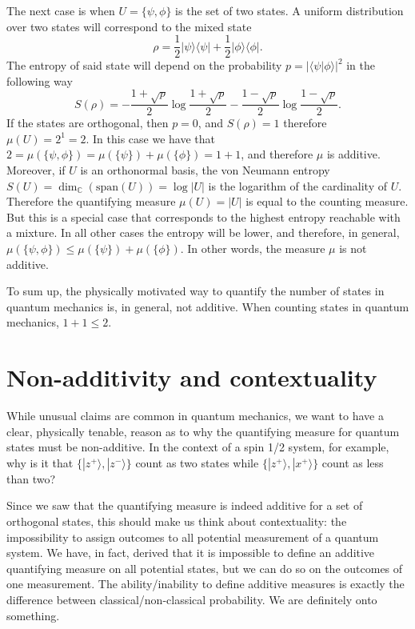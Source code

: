 \documentclass[10pt,twocolumn, nofootinbib]{revtex4-2}
\def\>{\rangle}
\def\<{\langle}
\begin{document}
The next case is when $U = \{ \psi, \phi \}$ is the set of two states. A uniform distribution over two states will correspond to the mixed state
\begin{equation}
	\rho = \frac{1}{2} |\psi\>\<\psi| + \frac{1}{2} |\phi\>\<\phi|.
\end{equation}
The entropy of said state will depend on the probability $p=|\<\psi | \phi \>|^2$ in the following way
\begin{equation}
	S(\rho) = - \frac{1+\sqrt{p}}{2} \log \frac{1+\sqrt{p}}{2} 
	- \frac{1-\sqrt{p}}{2} \log \frac{1-\sqrt{p}}{2}.
\end{equation}
If the states are orthogonal, then $p=0$, and $S(\rho) = 1$ therefore $\mu(U) = 2^1 = 2$. In this case we have that $2 = \mu(\{ \psi, \phi \}) = \mu(\{\psi\}) + \mu(\{\phi\}) = 1 + 1$, and therefore $\mu$ is additive. Moreover, if $U$ is an orthonormal basis, the von Neumann entropy $S(U) = \dim_{\mathbb{C}}(\text{span}(U)) = \log |U|$ is the logarithm of the cardinality of $U$. Therefore the quantifying measure $\mu(U) = |U|$ is equal to the counting measure. But this is a special case that corresponds to the highest entropy reachable with a mixture. In all other cases the entropy will be lower, and therefore, in general, $\mu(\{ \psi, \phi \}) \leq \mu(\{\psi\}) + \mu(\{\phi\})$. In other words, the measure $\mu$ is not additive.

To sum up, the physically motivated way to quantify the number of states in quantum mechanics is, in general, not additive. When counting states in quantum mechanics, $1+1 \leq 2$.

\section{Non-additivity and contextuality}

While unusual claims are common in quantum mechanics, we want to have a clear, physically tenable, reason as to why the quantifying measure for quantum states must be non-additive. In the context of a spin 1/2 system, for example, why is it that $\{ |z^+\>, |z^-\>\}$ count as two states while $\{ |z^+\>, |x^+\> \}$ count as less than two?

Since we saw that the quantifying measure is indeed additive for a set of orthogonal states, this should make us think about contextuality: the impossibility to assign outcomes to all potential measurement of a quantum system. We have, in fact, derived that it is impossible to define an additive quantifying measure on all potential states, but we can do so on the outcomes of one measurement. The ability/inability to define additive measures is exactly the difference between classical/non-classical probability. We are definitely onto something.
\end{document}
